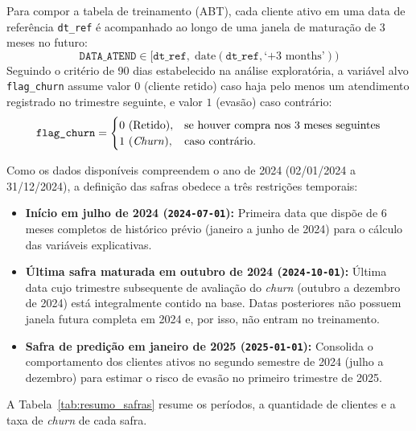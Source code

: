 Para compor a tabela de treinamento (ABT), cada cliente ativo em uma data de referência \texttt{dt\_ref} é acompanhado ao longo de uma janela de maturação de 3 meses no futuro:
\begin{equation}
    \texttt{DATA\_ATEND} \in \big[\texttt{dt\_ref}, \; \text{date}(\texttt{dt\_ref}, \text{`+3 months'})\big)
\end{equation}
Seguindo o critério de 90 dias estabelecido na análise exploratória, a variável alvo \texttt{flag\_churn} assume valor $0$ (cliente retido) caso haja pelo menos um atendimento registrado no trimestre seguinte, e valor $1$ (evasão) caso contrário:
\begin{equation}
    \texttt{flag\_churn} = 
    \begin{cases} 
        0 \text{ (Retido)}, & \text{se houver compra nos 3 meses seguintes} \\
        1 \text{ (\textit{Churn})}, & \text{caso contrário.}
    \end{cases}
\end{equation}

Como os dados disponíveis compreendem o ano de 2024 (02/01/2024 a 31/12/2024), a definição das safras obedece a três restrições temporais:
\begin{itemize}[leftmargin=*]
    \item \textbf{Início em julho de 2024 (\texttt{2024-07-01}):} Primeira data que dispõe de 6 meses completos de histórico prévio (janeiro a junho de 2024) para o cálculo das variáveis explicativas.
    \item \textbf{Última safra maturada em outubro de 2024 (\texttt{2024-10-01}):} Última data cujo trimestre subsequente de avaliação do \textit{churn} (outubro a dezembro de 2024) está integralmente contido na base. Datas posteriores não possuem janela futura completa em 2024 e, por isso, não entram no treinamento.
    \item \textbf{Safra de predição em janeiro de 2025 (\texttt{2025-01-01}):} Consolida o comportamento dos clientes ativos no segundo semestre de 2024 (julho a dezembro) para estimar o risco de evasão no primeiro trimestre de 2025.
\end{itemize}

A Tabela~\ref{tab:resumo_safras} resume os períodos, a quantidade de clientes e a taxa de \textit{churn} de cada safra.

